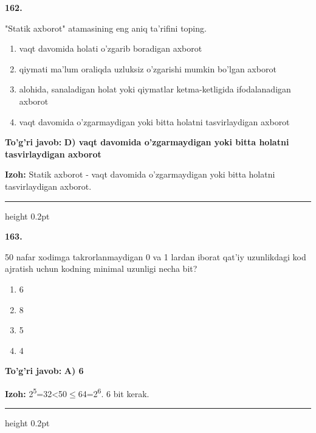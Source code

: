 \documentclass[10pt,a4paper,oneside]{article}
\begin{document}
\noindent\textbf{\color{ink}162.}
\par
"Statik axborot" atamasining eng aniq ta'rifini toping.
\begin{enumerate}[label=\Alph*),leftmargin=9mm]
\item vaqt davomida holati o'zgarib boradigan axborot
\item qiymati ma'lum oraliqda uzluksiz o'zgarishi mumkin bo'lgan axborot
\item alohida, sanaladigan holat yoki qiymatlar ketma-ketligida ifodalanadigan axborot
\item vaqt davomida o'zgarmaydigan yoki bitta holatni tasvirlaydigan axborot
\end{enumerate}
\begin{tcolorbox}[enhanced,breakable,colback=teal!4,colframe=teal!50!black,boxrule=0.5pt,arc=1.1mm,left=3mm,right=3mm,top=1.7mm,bottom=1.7mm,before skip=2mm,after skip=2mm]
\textbf{\color{teal}To'g'ri javob:} \textbf{D) vaqt davomida o'zgarmaydigan yoki bitta holatni tasvirlaydigan axborot}
\par\smallskip
\textbf{Izoh:} Statik axborot - vaqt davomida o'zgarmaydigan yoki bitta holatni tasvirlaydigan axborot.
\end{tcolorbox}
\vspace{2mm}\hrule height 0.2pt \vspace{3mm}

\noindent\textbf{\color{ink}163.}
\par
50 nafar xodimga takrorlanmaydigan 0 va 1 lardan iborat qat'iy uzunlikdagi kod ajratish uchun kodning minimal uzunligi necha bit?
\begin{enumerate}[label=\Alph*),leftmargin=9mm]
\item 6
\item 8
\item 5
\item 4
\end{enumerate}
\begin{tcolorbox}[enhanced,breakable,colback=teal!4,colframe=teal!50!black,boxrule=0.5pt,arc=1.1mm,left=3mm,right=3mm,top=1.7mm,bottom=1.7mm,before skip=2mm,after skip=2mm]
\textbf{\color{teal}To'g'ri javob:} \textbf{A) 6}
\par\smallskip
\textbf{Izoh:} 2\textsuperscript{5}=32\textless{}50\ensuremath{\leq}64=2\textsuperscript{6}. 6 bit kerak.
\end{tcolorbox}
\vspace{2mm}\hrule height 0.2pt \vspace{3mm}
\end{document}
